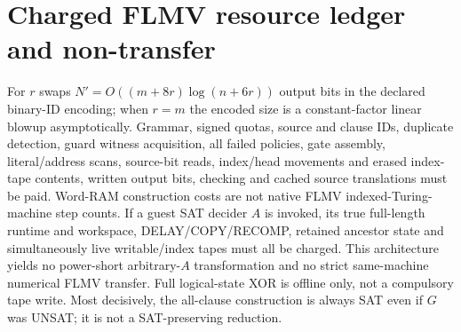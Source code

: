 \documentclass[11pt]{article}
\begin{document}
\section{Charged FLMV resource ledger and non-transfer}
For $r$ swaps $N'=O((m+8r)\log(n+6r))$ output bits in the declared binary-ID encoding; when $r=m$ the encoded size is a constant-factor linear blowup asymptotically. Grammar, signed quotas, source and clause IDs, duplicate detection, guard witness acquisition, all failed policies, gate assembly, literal/address scans, source-bit reads, index/head movements and erased index-tape contents, written output bits, checking and cached source translations must be paid. Word-RAM construction costs are not native FLMV indexed-Turing-machine step counts. If a guest SAT decider $A$ is invoked, its true full-length runtime and workspace, DELAY/COPY/RECOMP, retained ancestor state and simultaneously live writable/index tapes must all be charged. This architecture yields no power-short arbitrary-$A$ transformation and no strict same-machine numerical FLMV transfer. Full logical-state XOR is offline only, not a compulsory tape write. Most decisively, the all-clause construction is always SAT even if $G$ was UNSAT; it is not a SAT-preserving reduction.
\end{document}
